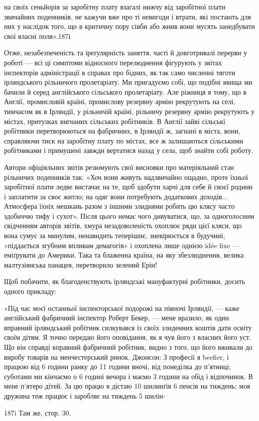 на своїх сеньйорів за заробітну плату взагалі нижчу від заробітної
плати звичайних поденників, не кажучи вже про ті невигоди
і втрати, які постають для них у наслідок того, що в критичну
пору сівби або жнив вони мусять занедбувати свої власні поля».187і

Отже, незабезпеченість та іреґулярність заняття, часті й довготривалі
перерви у роботі — всі ці симптоми відносного перелюднення
фігурують у звітах інспекторів адміністрації в справах
про бідних, як так само численні тяготи ірляндського рільничого
пролетаріату. Ми пригадуємо собі, що подібні явища ми бачили
й серед англійського сільського пролетаріату. Але ріжниця
в тому, що в Англії, промисловій країні, промислову резервну
армію рекрутують на селі, тимчасом як в Ірляндії, у рільничій
країні, рільничу резервну армію рекрутують у містах, притулках
вигнаних сільських робітників. В Англії зайві сільські робітники
перетворюються на фабричних, в Ірляндії ж, загнані в міста,
вони, справляючи тиск на заробітну плату по містах, все ж залишаються
сільськими робітниками і примушені завжди вертатися
назад у села, щоб знайти собі роботу.

Автори офіціяльних звітів резюмують свої висновки про
матеріяльний стан рільничих поденників так: «Хоч вони живуть
надзвичайно ощадно, проте їхньої заробітної плати ледве вистачає
на те, щоб здобути харчі для себе й своєї родини і заплатити
за своє житло; на одяг вони потребують додаткових доходів...
Атмосфера їхніх мешкань разом з іншими злиднями робить цю
клясу часто здобиччю тифу і сухот». Після цього немає чого
дивуватися, що, за одноголосним свідченням авторів звітів,
хмура незадоволеність охоплює ряди цієї кляси, що вона сумує
за минулим, ненавидить теперішнє, зневірюється в будучині,
«піддається згубним впливам демагогів» і охоплена лише однією
idée fixe — еміґрувати до Америки. Така та блаженна країна,
на яку збезлюднення, велика малтузіянська панацея, перетворило
зелений Ерін!

Щоб побачити, як благоденствують ірляндські мануфактурні
робітники, досить одного прикладу:

«Під час моєї останньої інспекторської подорожі на півночі
Ірляндії, — каже англійський фабричний інспектор Роберт Бекер,
— мене вразило, як один вправний ірляндський робітник
силкувався із своїх злиденних коштів дати освіту своїм дітям.
Я точно передаю його оповідання, як я чув його з власних його
уст. Що він справді вправний фабричний робітник, видно з того,
що його вживали до виробу товарів на менчестерський ринок.
Джонсон: З професії я beefier, і працюю від 6 години ранку до
11 години вночі, від понеділка до п’ятниці; суботами ми кінчаємо
о 6 годині вечора і маємо 3 години на обід і відпочинок. В мене
п’ятеро дітей. За цю працю я дістаю 10 шилинґів 6 пенсів на тиждень;
моя дружина теж працює і заробляє на тиждень 5 шилін-

187i Там же, стор. 30.